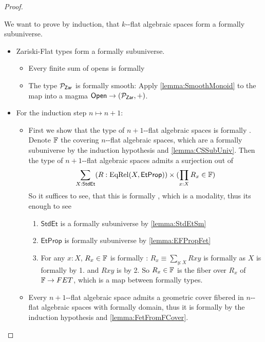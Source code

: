 \begin{proof}
\begin{itemize}
\begin{enumerate}
		\end{enumerate}
		We want to prove by induction, that $k$-\etale-flat algebraic spaces form a formally \etale subuniverse.
		\begin{itemize}
			\item  Zariski-Flat types form a formally \etale subuniverse. 
			\begin{itemize}
				\item Every finite sum of opens is formally \etale
				\item The type $\mathcal{P}_{\mathsf{Zar}}$ is formally smooth: Apply \ref{lemma:SmoothMonoid} to the map into a magma $\mathsf{Open}  \to (\mathcal{P}_{\mathsf{Zar}}, +)$.
				
			\end{itemize}
			\item For the induction step $n \mapsto n+1$:
			\begin{itemize}
				\item 	First we show that the type of $n+1$-\etale-flat algebraic spaces is formally \etale. Denote $\mathbb{F}$ the covering $n$-\etale-flat algebraic spaces, which are a formally \etale subuniverse by the induction hypothesis and \ref{lemma:CSSubUniv}. Then the type of $n+1$-\etale-flat algebraic spaces admits a surjection out of 
				\[\sum_{X: \mathsf{StdEt}} (R : \mathrm{EqRel}(X  , \mathsf{EtProp})) \times (\prod_{x : X} R_x \in \mathbb{F}) \]
				So it suffices to see, that this is formally \etale, which is a modality, thus its enough to see
					\begin{enumerate}
						\item $\mathsf{StdEt}$ is a formally \etale subuniverse by \ref{lemma:StdEtSm}
						\item $\mathsf{EtProp}$ is formally \etale subuniverse by \ref{lemma:EFPropFet}
						\item For any $x : X$, $R_x \in \mathbb{F}$ is formally \etale: $R_x \equiv \sum_{y:X} R x y$ is formally \etale as $X$ is formally \etale by 1. and $R x y$ is by 2. So $R_x \in \mathbb{F}$ is the fiber over $R_x$ of $\mathbb{F} \to FET$, which is a map between formally \etale types.
					\end{enumerate}
				\item Every $n+1$-\etale-flat algebraic space admits a geometric cover fibered in $n$-\etale-flat algebraic spaces with formally \etale domain, thus it is formally \etale by the induction hypothesis and \ref{lemma:FetFromFCover}.
			\end{itemize}

\end{itemize}
\end{itemize}
\end{proof}

